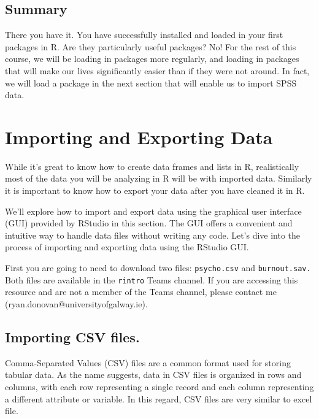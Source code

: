 \documentclass[
]{book}
\begin{document}
\hypertarget{summary-3}{%
\subsection{Summary}\label{summary-3}}

There you have it. You have successfully installed and loaded in your first packages in R. Are they particularly useful packages? No! For the rest of this course, we will be loading in packages more regularly, and loading in packages that will make our lives significantly easier than if they were not around. In fact, we will load a package in the next section that will enable us to import SPSS data.

\hypertarget{importing-and-exporting-data}{%
\section{Importing and Exporting Data}\label{importing-and-exporting-data}}

While it's great to know how to create data frames and lists in R, realistically most of the data you will be analyzing in R will be with imported data. Similarly it is important to know how to export your data after you have cleaned it in R.

We'll explore how to import and export data using the graphical user interface (GUI) provided by RStudio in this section. The GUI offers a convenient and intuitive way to handle data files without writing any code. Let's dive into the process of importing and exporting data using the RStudio GUI.

First you are going to need to download two files: \texttt{psycho.csv} and \texttt{burnout.sav.} Both files are available in the \texttt{rintro} Teams channel. If you are accessing this resource and are not a member of the Teams channel, please contact me (ryan.donovan@universityofgalway.ie).

\hypertarget{importing-csv-files.}{%
\subsection{Importing CSV files.}\label{importing-csv-files.}}

Comma-Separated Values (CSV) files are a common format used for storing tabular data. As the name suggests, data in CSV files is organized in rows and columns, with each row representing a single record and each column representing a different attribute or variable. In this regard, CSV files are very similar to excel file.
\end{document}
